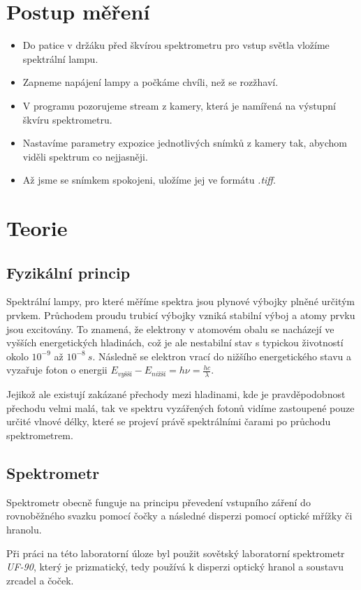 \documentclass[a4paper,12pt]{article}
\begin{document}
\section{Postup měření}
\begin{itemize}
    \item Do patice v držáku před škvírou spektrometru pro vstup světla vložíme spektrální lampu.
    \item Zapneme napájení lampy a počkáme chvíli, než se rozžhaví.
    \item V programu pozorujeme stream z kamery, která je namířená na výstupní škvíru spektrometru.
    \item Nastavíme parametry expozice jednotlivých snímků z kamery tak, abychom viděli spektrum co nejjasněji.
    \item Až jsme se snímkem spokojeni, uložíme jej ve formátu \textit{.tiff}.
\end{itemize}

\section{Teorie}
\subsection{Fyzikální princip}
Spektrální lampy, pro které měříme spektra jsou plynové výbojky plněné určitým prvkem. Průchodem proudu trubicí výbojky vzniká stabilní výboj
a atomy prvku jsou excitovány. To znamená, že elektrony v atomovém obalu se nacházejí ve vyšších energetických hladinách, což je ale nestabilní stav s typickou životností okolo $10^{-9}$ až $10^{-8}\ s$. 
Následně se elektron vrací do nižšího energetického stavu a vyzařuje foton o energii $E_{vyšší} - E_{nižší} = h\nu = \frac{hc}{\lambda}$. 

Jejikož ale existují zakázané přechody mezi hladinami, kde je pravděpodobnost přechodu velmi malá, tak ve spektru vyzářených fotonů vidíme zastoupené pouze určité vlnové délky, které se projeví právě spektrálními čarami po průchodu spektrometrem. 

\subsection{Spektrometr}
Spektrometr obecně funguje na principu převedení vstupního záření do rovnoběžného svazku pomocí čočky a následné disperzi pomocí optické mřížky či hranolu. 

Při práci na této laboratorní úloze byl použit sovětský laboratorní spektrometr \textit{UF-90}, který je prizmatický, tedy používá k disperzi optický hranol a soustavu zrcadel a čoček. 
\end{document}
